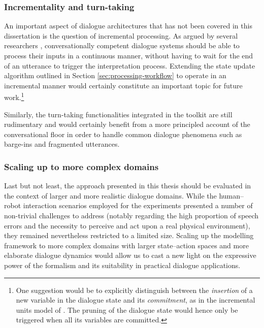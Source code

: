 \subsubsection*{Incrementality and turn-taking}

An important aspect of dialogue architectures that has not been covered in this dissertation is the question of incremental processing. As argued by several researchers \citep[see for instance][]{schlangen2009general}, conversationally competent dialogue systems should be able to process their inputs in a continuous manner, without having to wait for the end of an utterance to trigger the interpretation process.  Extending the state update algorithm outlined in Section \ref{sec:processing-workflow} to operate in an incremental manner would certainly constitute an important topic for future work.\footnote{One suggestion would be to explicitly distinguish between the \textit{insertion} of a new variable in the dialogue state and its \textit{commitment}, as in the incremental units model of \cite{schlangen2009general}.  The pruning of the dialogue state would hence only be triggered when all its variables are committed.}

Similarly, the turn-taking  functionalities integrated in the \opendial{} toolkit are still rudimentary and would certainly benefit from a more principled account of the conversational floor in order to handle common dialogue phenomena such as barge-ins and fragmented utterances. 

\subsubsection*{Scaling up to more complex domains}

Last but not least, the approach presented in this thesis should be evaluated in the context of larger and more realistic dialogue domains. While the human--robot interaction scenarios employed for the experiments presented a number of non-trivial challenges to address (notably regarding the high proportion of speech errors and the necessity to perceive and act upon a real physical environment), they remained nevertheless restricted to a limited size. Scaling up the modelling framework to more complex domains with larger state--action spaces and more elaborate dialogue dynamics would allow us to cast a new light on the expressive power of the formalism and its suitability in practical dialogue applications. 

